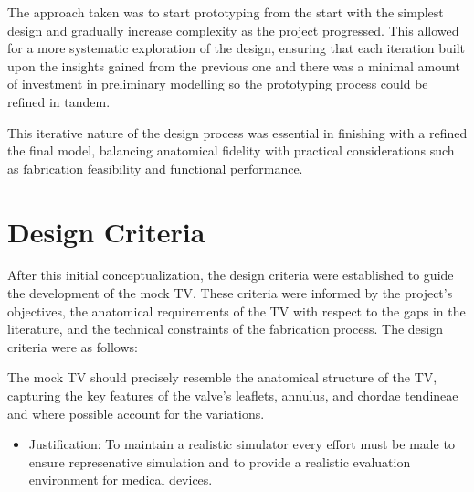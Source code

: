 
The approach taken was to start prototyping from the start with the simplest design and gradually increase complexity as the project progressed. This allowed for a more systematic exploration of the design, ensuring that each iteration built upon the insights gained from the previous one and there was a minimal amount of investment in preliminary modelling so the prototyping process could be refined in tandem.

This iterative nature of the design process was essential in finishing with a refined the final model, balancing anatomical fidelity with practical considerations such as fabrication feasibility and functional performance.


\section{Design Criteria}
After this initial conceptualization, the design criteria were established to guide the development of the mock \gls{TV}. These criteria were informed by the project's objectives, the anatomical requirements of the \gls{TV} with respect to the gaps in the literature, and the technical constraints of the fabrication process.
    {The design criteria were as follows:}

 The mock \gls{TV} should precisely resemble the anatomical structure of the \gls{TV}, capturing the key features of the valve's leaflets, annulus, and chordae tendineae and where possible account for the variations.
\begin{itemize}
    \item Justification: To maintain a realistic simulator every effort must be made to ensure represenative simulation and to provide a realistic evaluation environment for medical devices.
\end{itemize}

